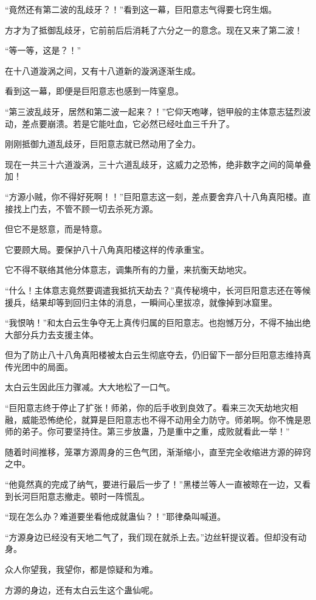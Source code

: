 \begin{this_body}
“竟然还有第二波的乱歧牙？！”看到这一幕，巨阳意志气得要七窍生烟。

方才为了抵御乱歧牙，它前前后后消耗了六分之一的意念。现在又来了第二波！

“等一等，这是？！”

在十八道漩涡之间，又有十八道新的漩涡逐渐生成。

看到这一幕，即便是巨阳意志也感到一阵窒息。

“第三波乱歧牙，居然和第二波一起来？！”它仰天咆哮，铠甲般的主体意志猛烈波动，差点要崩溃。若是它能吐血，它必然已经吐血三千升了。

刚刚抵御九道乱歧牙，巨阳意志就已然动用了全力。

现在一共三十六道漩涡，三十六道乱歧牙，这威力之恐怖，绝非数字之间的简单叠加！

“方源小贼，你不得好死啊！！”巨阳意志这一刻，差点要舍弃八十八角真阳楼。直接找上门去，不管不顾一切去杀死方源。

但它不是怒意，而是特意。

它要顾大局。要保护八十八角真阳楼这样的传承重宝。

它不得不联络其他分体意志，调集所有的力量，来抗衡天劫地灾。

“什么！主体意志竟然要调遣我抵抗天劫去？”真传秘境中，长河巨阳意志还在等候援兵，结果却等到回归主体的消息，一瞬间心里拔凉，就像掉到冰窟里。

“我恨呐！”和太白云生争夺无上真传归属的巨阳意志。也抱憾万分，不得不抽出绝大部分兵力去支援主体。

但为了防止八十八角真阳楼被太白云生彻底夺去，仍旧留下一部分巨阳意志维持真传光团中的局面。

太白云生因此压力骤减。大大地松了一口气。

“巨阳意志终于停止了扩张！师弟，你的后手收到良效了。看来三次天劫地灾相融，威能恐怖绝伦，就算是巨阳意志也不得不动用全力防守。师弟啊。你不愧是恩师的弟子。你可要坚持住。第三步放蛊，乃是重中之重，成败就看此一举！”

随着时间推移，笼罩方源周身的三色气团，渐渐缩小，直至完全收缩进方源的碎窍之中。

“他竟然真的完成了纳气，要进行最后一步了！”黑楼兰等人一直被晾在一边，又看到长河巨阳意志撤走。顿时一阵慌乱。

“现在怎么办？难道要坐看他成就蛊仙？！”耶律桑叫喊道。

“方源身边已经没有天地二气了，我们现在就杀上去。”边丝轩提议着。但却没有动身。

众人你望我，我望你，都是惊疑和为难。

方源的身边，还有太白云生这个蛊仙呢。


\end{this_body}
